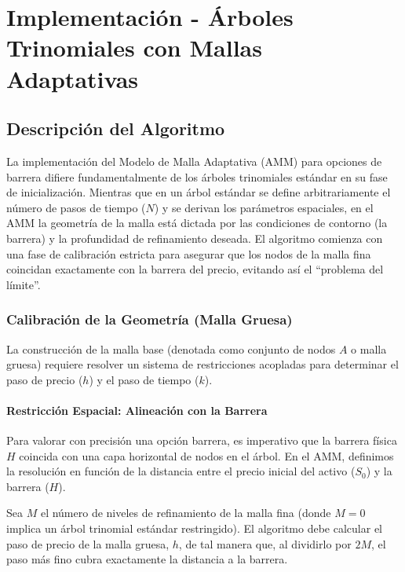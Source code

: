 \chapter{Implementación - Árboles Trinomiales con Mallas Adaptativas}
\label{chapter:impl_arboles_mallas}

\section{Descripción del Algoritmo}
\label{sec:algoritmo_arboles_mallas}

La implementación del Modelo de Malla Adaptativa (AMM) para opciones de barrera difiere fundamentalmente de los árboles trinomiales estándar en su fase de inicialización. Mientras que en un árbol estándar se define arbitrariamente el número de pasos de tiempo ($N$) y se derivan los parámetros espaciales, en el AMM la geometría de la malla está dictada por las condiciones de contorno (la barrera) y la profundidad de refinamiento deseada.
El algoritmo comienza con una fase de calibración estricta para asegurar que los nodos de la malla fina coincidan exactamente con la barrera del precio, evitando así el ``problema del límite''.

\subsection{Calibración de la Geometría (Malla Gruesa)}

La construcción de la malla base (denotada como conjunto de nodos $A$ o malla gruesa) requiere resolver un sistema de restricciones acopladas para determinar el paso de precio ($h$) y el paso de tiempo ($k$).

\subsubsection{Restricción Espacial: Alineación con la Barrera} 

Para valorar con precisión una opción barrera, es imperativo que la barrera física $H$ coincida con una capa horizontal de nodos en el árbol. En el AMM, definimos la resolución en función de la distancia entre el precio inicial del activo ($S_0$) y la barrera ($H$).

Sea $M$ el número de niveles de refinamiento de la malla fina (donde $M=0$ implica un árbol trinomial estándar restringido). El algoritmo debe calcular el paso de precio de la malla gruesa, $h$, de tal manera que, al dividirlo por $2M$, el paso más fino cubra exactamente la distancia a la barrera.

